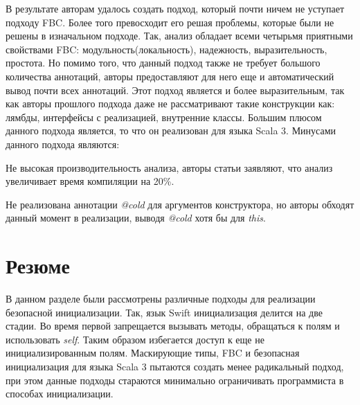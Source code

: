 В результате авторам удалось создать подход, который почти ничем не уступает подходу FBC\@.
Более того превосходит его решая проблемы, которые были не решены в изначальном подходе.
Так, анализ обладает всеми четырьмя приятными свойствами FBC: модульность(локальность), надежность, выразительность, простота.
Но помимо того, что данный подход также не требует большого количества аннотаций,
авторы предоставляют для него еще и автоматический вывод почти всех аннотаций.
Этот подход является и более выразительным, так как авторы прошлого подхода даже не рассматривают такие конструкции как:
лямбды, интерфейсы с реализацией, внутренние классы.
Большим плюсом данного подхода является, то что он реализован для языка Scala 3.
Минусами данного подхода являются:
\begin{itemize*}
    \item Не высокая производительность анализа, авторы статьи заявляют, что анализ увеличивает время компиляции на 20\%.
    \item Не реализована аннотации \emph{@cold} для аргументов конструктора,
    но авторы обходят данный момент в реализации, выводя \emph{@cold} хотя бы для \emph{this}.
\end{itemize*}

\section{Резюме}\label{sec:обзор-резюме}

В данном разделе были рассмотрены различные подходы для реализации безопасной инициализации.
Так, язык Swift инициализация делится на две стадии.
Во время первой запрещается вызывать методы, обращаться к полям и использовать \emph{self}.
Таким образом избегается доступ к еще не инициализированным полям.
Маскирующие типы, FBC и безопасная инициализация для языка Scala 3 пытаются создать менее радикальный подход,
при этом данные подходы стараются минимально ограничивать программиста в способах инициализации.

